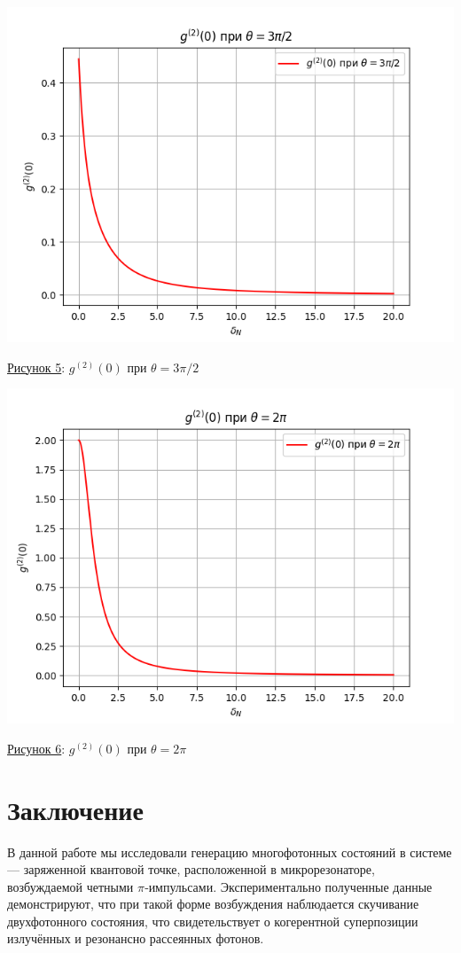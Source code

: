 \documentclass[11pt]{article}    %
\begin{document}
\begin{center}
\includegraphics[scale = 0.8]{plot5.png}
\par
    \underline{Рисунок 5}: $g^{(2)}(0)$ при $\theta = 3\pi/2$
\end{center}
\par
\begin{center}
\includegraphics[scale = 0.8]{plot6.png}
\par
    \underline{Рисунок 6}: $g^{(2)}(0)$ при $\theta = 2\pi$
\end{center}
\par

\section{Заключение}
В данной работе мы исследовали генерацию многофотонных состояний в системе — заряженной квантовой точке,
расположенной в микрорезонаторе, возбуждаемой четными $\pi$‑импульсами.
Экспериментально полученные данные демонстрируют,
что при такой форме возбуждения наблюдается скучивание двухфотонного состояния,
что свидетельствует о когерентной суперпозиции излучённых и резонансно рассеянных фотонов.
\end{document}
